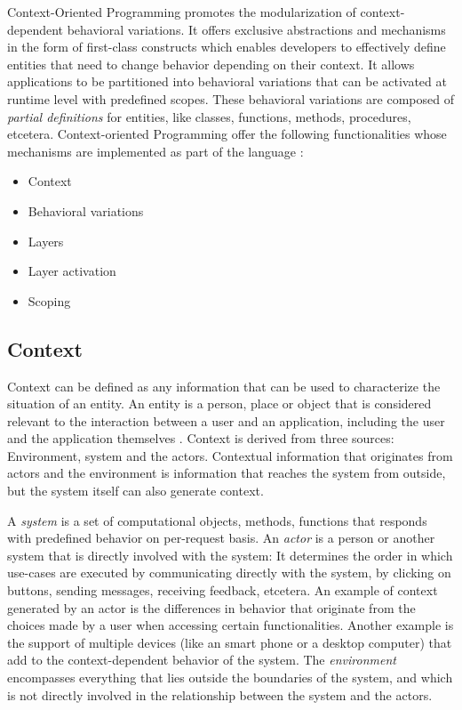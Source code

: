 \documentclass{acm_proc_article-sp}
\begin{document}
Context-Oriented Programming promotes the modularization of context-dependent behavioral variations. It offers exclusive abstractions and mechanisms in the form of first-class constructs which enables developers to effectively define entities that need to change behavior depending on their context. It allows applications to be partitioned into behavioral variations that can be activated at runtime level with predefined scopes. These behavioral variations are composed of \textit{partial definitions} for entities, like classes, functions, methods, procedures, etcetera. Context-oriented Programming offer the following functionalities whose mechanisms are implemented as part of the language \cite{Costanza:2008:CPC:1529966.1529970}:

\begin{itemize}
\item {Context}
\item Behavioral variations
\item Layers
\item Layer activation
\item Scoping
\end{itemize}

\subsection{Context}
\label{sec:context}
Context can be defined as any information that can be used to characterize the situation of an entity. An entity is a person, place or object that is considered relevant to the interaction between a user and an application, including the user and the application themselves \cite{Abowd:1999:TBU:647985.743843}. Context is derived from three sources: Environment, system and the actors. Contextual information that originates from actors and the environment is information that reaches the system from outside, but the system itself can also generate context. 

A \textit{system} is a set of computational objects, methods, functions that responds with predefined behavior on per-request basis. An \textit{actor} is a person or another system that is directly involved with the system: It determines the order in which use-cases are executed by communicating directly with the system, by clicking on buttons, sending messages, receiving feedback, etcetera. An example of context generated by an actor is the differences in behavior that originate from the choices made by a user when accessing certain functionalities. Another example is the support of multiple devices (like an smart phone or a desktop computer) that add to the context-dependent behavior of the system. The \textit{environment} encompasses everything that lies outside the boundaries of the system, and which is not directly involved in the relationship between the system and the actors.
\end{document}
